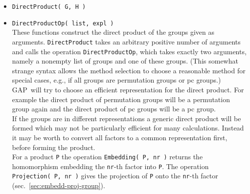 \documentclass[11pt]{amsart}
\newcommand{\gap}{GAP}   %
\theoremstyle{plain}
\newcommand{\subsectionspace}{~\\[-6pt]}
\newcommand{\<}{\ensuremath{\langle}}
\renewcommand{\>}{\ensuremath{\rangle}}
\begin{document}
\begin{itemize}
\item {\tt DirectProduct( G, H )}
\item {\tt DirectProductOp( list, expl )}\\[2pt] 
These functions construct the direct product of the groups given as arguments. 
{\tt DirectProduct} takes an arbitrary positive number of arguments and calls the
operation {\tt DirectProductOp}, which takes exactly two arguments, namely a nonempty
list of groups and one of these groups. (This somewhat strange syntax allows the
method selection to choose a reasonable method for special cases, e.g., if all groups
are permutation groups or pc groups.)
\\[5pt]
\gap\ will try to choose an efficient representation for the direct product. For example the direct product
of permutation groups will be a permutation group again and the direct product of pc groups will be a pc
group.
\\[5pt]
If the groups are in different representations a generic direct product will be formed which may not be
particularly efficient for many calculations. Instead it may be worth to convert all factors to a common
representation first, before forming the product.
\\[5pt]
For a product {\tt P} the operation {\tt Embedding( P, nr )} returns the
homomorphism embedding the {\tt nr}-th factor into {\tt P}. The operation
{\tt Projection( P, nr )} gives the projection of {\tt P} onto the {\tt nr}-th factor
(sec.~\ref{sec:embedd-proj-group}).
\end{itemize}
\subsectionspace
\end{document}
